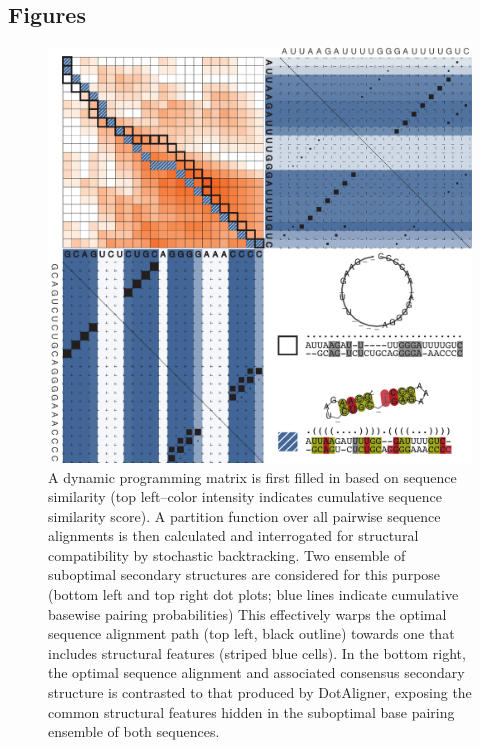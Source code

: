 \documentclass{bmcart}
\begin{document}
\begin{backmatter}


\section*{Figures}

\begin{figure}[h!]
\includegraphics[width=\textwidth]{fig1}
 \caption {
  A dynamic  programming matrix is first filled in based on sequence 
  similarity (top left--color intensity indicates cumulative sequence similarity score). 
  A partition function over all pairwise sequence alignments is then calculated and 
  interrogated for structural compatibility by stochastic backtracking. 
  Two ensemble of suboptimal secondary structures are considered for this purpose
  (bottom left and top right dot plots; blue lines indicate cumulative basewise pairing probabilities)      This effectively warps the optimal  sequence alignment path (top left, black outline) towards one that includes structural features (striped blue cells).  In the bottom right, the optimal sequence alignment 
  and associated consensus secondary structure is contrasted to that produced 
  by DotAligner, exposing the common structural features hidden in the suboptimal 
  base pairing ensemble of both sequences. 
 }
\end{figure}



\end{backmatter}
\end{document}
